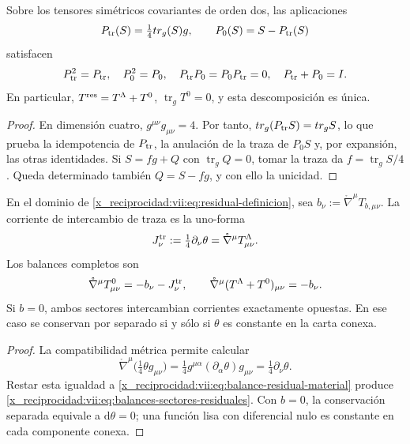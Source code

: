 \begin{proposition}
\label{x_reciprocidad:vii:prop:proyectores-traza-residual}
Sobre los tensores simétricos covariantes de orden dos, las aplicaciones
\[
 P_{\rm tr}(S)=\tfrac14\operatorname{tr}_g(S)g,
 \qquad P_0(S)=S-P_{\rm tr}(S)
\]
satisfacen
\begin{equation}
 P_{\rm tr}^2=P_{\rm tr},\quad P_0^2=P_0,\quad
 P_{\rm tr}P_0=P_0P_{\rm tr}=0,\quad P_{\rm tr}+P_0=I.
 \label{x_reciprocidad:vii:eq:proyectores-traza-residual}
\end{equation}
En particular, \(T^{\rm res}=T^\Lambda+T^0\),
\(\operatorname{tr}_gT^0=0\), y esta descomposición es única.
\end{proposition}
\begin{proof}
En dimensión cuatro, \(g^{\mu\nu}g_{\mu\nu}=4\). Por tanto,
\(\operatorname{tr}_g(P_{\rm tr}S)=\operatorname{tr}_gS\), lo que
prueba la idempotencia de \(P_{\rm tr}\), la anulación de la traza
de \(P_0S\) y, por expansión, las otras identidades.
Si \(S=fg+Q\) con \(\operatorname{tr}_gQ=0\), tomar la traza
da \(f=\operatorname{tr}_gS/4\). Queda determinado también
\(Q=S-fg\), y con ello la unicidad.
\end{proof}

\begin{theorem}
\label{x_reciprocidad:vii:thm:intercambio-traza-residual}
En el dominio de \eqref{x_reciprocidad:vii:eq:residual-definicion}, sea
\(b_\nu:=\mathring\nabla^\mu T_{b,\mu\nu}\). La corriente
de intercambio de traza es la uno-forma
\begin{equation}
 \mathcal J^{\rm tr}_\nu
 :=\tfrac14\partial_\nu\theta
 =\mathring\nabla^\mu T^\Lambda_{\mu\nu}.
 \label{x_reciprocidad:vii:eq:corriente-intercambio-traza}
\end{equation}
Los balances completos son
\begin{equation}
 \mathring\nabla^\mu T^0_{\mu\nu}
       =-b_\nu-\mathcal J^{\rm tr}_\nu,
 \qquad
 \mathring\nabla^\mu(T^\Lambda+T^0)_{\mu\nu}=-b_\nu.
 \label{x_reciprocidad:vii:eq:balances-sectores-residuales}
\end{equation}
Si \(b=0\), ambos sectores intercambian corrientes exactamente opuestas.
En ese caso se conservan por separado si y sólo si \(\theta\) es
constante en la carta conexa.
\end{theorem}
\begin{proof}
La compatibilidad métrica permite calcular
\[
 \mathring\nabla^\mu\bigl(\tfrac14\theta g_{\mu\nu}\bigr)
 =\tfrac14g^{\mu\alpha}(\partial_\alpha\theta)g_{\mu\nu}
 =\tfrac14\partial_\nu\theta.
\]
Restar esta igualdad a \eqref{x_reciprocidad:vii:eq:balance-residual-material} produce
\eqref{x_reciprocidad:vii:eq:balances-sectores-residuales}. Con \(b=0\), la
conservación separada equivale a \(\mathrm d\theta=0\); una función
lisa con diferencial nulo es constante en cada componente conexa.
\end{proof}

